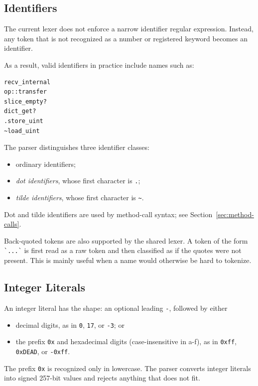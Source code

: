 \documentclass[12pt,oneside]{article}
\begin{document}
\subsection{Identifiers}
The current lexer does not enforce a narrow identifier regular expression.
Instead, any token that is not recognized as a number or registered keyword
becomes an identifier.

As a result, valid identifiers in practice include names such as:

\begin{verbatim}
recv_internal
op::transfer
slice_empty?
dict_get?
.store_uint
~load_uint
\end{verbatim}

The parser distinguishes three identifier classes:

\begin{itemize}
\item ordinary identifiers;
\item \emph{dot identifiers}, whose first character is \verb|.|;
\item \emph{tilde identifiers}, whose first character is \verb|~|.
\end{itemize}

Dot and tilde identifiers are used by method-call syntax; see
Section~\ref{sec:method-calls}.

Back-quoted tokens are also supported by the shared lexer. A token of the form
\verb|`...`| is first read as a raw token and then classified as if the quotes
were not present. This is mainly useful when a name would otherwise be hard to
tokenize.

\subsection{Integer Literals}
An integer literal has the shape: an optional leading \verb|-|, followed by
either

\begin{itemize}
\item decimal digits, as in \verb|0|, \verb|17|, or \verb|-3|; or
\item the prefix \verb|0x| and hexadecimal digits (case-insensitive in a-f),
as in \verb|0xff|, \verb|0xDEAD|, or \verb|-0xff|.
\end{itemize}

The prefix \verb|0x| is recognized only in lowercase. The parser converts
integer literals into signed 257-bit values and rejects anything that does
not fit.
\end{document}
